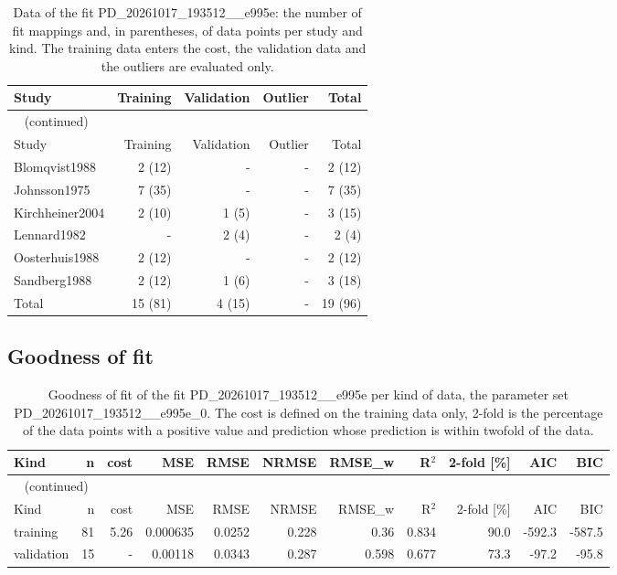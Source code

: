 \begin{longtable}{lrrrr}
\caption{Data of the fit PD\_20261017\_193512\_\_e995e: the number of fit mappings and, in parentheses, of data points per study and kind. The training data enters the cost, the validation data and the outliers are evaluated only.}\label{tab:data:PD_20261017_193512__e995e} \\
\toprule
Study & Training & Validation & Outlier & Total \\
\midrule
\endfirsthead
\multicolumn{5}{l}{\small\tablename~\thetable{} (continued)} \\
\toprule
Study & Training & Validation & Outlier & Total \\
\midrule
\endhead
\bottomrule
\endlastfoot
Blomqvist1988 & 2 (12) & - & - & 2 (12) \\
Johnsson1975 & 7 (35) & - & - & 7 (35) \\
Kirchheiner2004 & 2 (10) & 1 (5) & - & 3 (15) \\
Lennard1982 & - & 2 (4) & - & 2 (4) \\
Oosterhuis1988 & 2 (12) & - & - & 2 (12) \\
Sandberg1988 & 2 (12) & 1 (6) & - & 3 (18) \\
Total & 15 (81) & 4 (15) & - & 19 (96) \\
\end{longtable}

\subsection{Goodness of fit}

\begin{longtable}{lrrrrrrrrrr}
\caption{Goodness of fit of the fit PD\_20261017\_193512\_\_e995e per kind of data, the parameter set PD\_20261017\_193512\_\_e995e\_0. The cost is defined on the training data only, 2-fold is the percentage of the data points with a positive value and prediction whose prediction is within twofold of the data.}\label{tab:metrics:PD_20261017_193512__e995e} \\
\toprule
Kind & n & cost & MSE & RMSE & NRMSE & RMSE\_w & R\ensuremath{^{2}} & 2-fold [\%] & AIC & BIC \\
\midrule
\endfirsthead
\multicolumn{11}{l}{\small\tablename~\thetable{} (continued)} \\
\toprule
Kind & n & cost & MSE & RMSE & NRMSE & RMSE\_w & R\ensuremath{^{2}} & 2-fold [\%] & AIC & BIC \\
\midrule
\endhead
\bottomrule
\endlastfoot
training & 81 & 5.26 & 0.000635 & 0.0252 & 0.228 & 0.36 & 0.834 & 90.0 & -592.3 & -587.5 \\
validation & 15 & - & 0.00118 & 0.0343 & 0.287 & 0.598 & 0.677 & 73.3 & -97.2 & -95.8 \\
\end{longtable}

